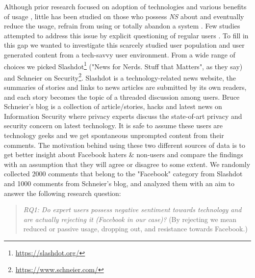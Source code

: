 Although prior research focused on adoption of technologies and various benefits of usage \cite{joinson2008looking}, little has been studied on those who possess \emph{NS} about and eventually reduce the usage, refrain from using or totally abandon a system \cite{wyatt2003non}. Few studies attempted to address this issue by explicit questioning of regular users \cite{baumer2013limiting, nonnecke2001lurkers}. To fill in this gap we wanted to investigate this scarcely studied user population \cite{baumer2014refusing} and user generated content from a tech-savvy user environment. From a wide range of choices we picked Slashdot\footnote{\url{https://slashdot.org/}} ("News for Nerds. Stuff that Matters", as they say) and Schneier on Security\footnote{\url{https://www.schneier.com/}}. Slashdot is a technology-related news website, the summaries of stories and links to news articles are submitted by its own readers, and each story becomes the topic of a threaded discussion among users. Bruce Schneier's blog is a collection of article/stories, hacks and latest news on Information Security where privacy experts discuss the state-of-art privacy and security concern on latest technology. It is safe to assume these users are technology geeks and we get spontaneous unprompted content from their comments. The motivation behind using these two different sources of data is to get better insight about Facebook haters \& non-users and compare the findings with an assumption that they will agree or disagree to some extent. We randomly collected 2000 comments that belong to the "Facebook" category from Slashdot and 1000 comments from Schneier's blog, and analyzed them with an aim to answer the following research question:


\begin{quote}
    \textit{RQ1: Do expert users possess negative sentiment towards technology and are actually rejecting it (Facebook in our case)?} (By rejecting we mean reduced or passive usage, dropping out, and resistance towards Facebook.)

\end{quote}


